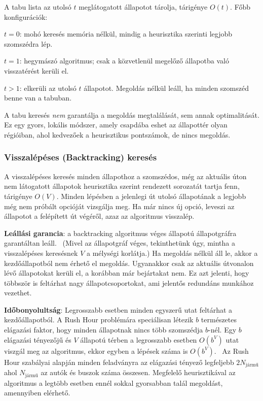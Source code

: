 A tabu lista az utolsó $t$ meglátogatott állapotot tárolja, tárigénye $O(t)$. Főbb konfigurációk:
\begin{compactitem}
\item $t = 0$: mohó keresés memória nélkül, mindig a heurisztika szerinti legjobb szomszédra lép.
\item $t = 1$: hegymászó algoritmus; csak a közvetlenül megelőző állapotba való visszatérést kerüli el.
\item $t > 1$: elkerüli az utolsó $t$ állapotot. Megoldás nélkül leáll, ha minden szomszéd benne van a tabuban.
\end{compactitem}

A tabu keresés \emph{nem} garantálja a megoldás megtalálását, sem annak optimalitását. Ez egy gyors, lokális módszer, amely csapdába eshet az állapottér olyan régióiban, ahol kedvezőek a heurisztikus pontszámok, de nincs megoldás.

\subsubsection{Visszalépéses (Backtracking) keresés}
\label{sec:backtracking}

A visszalépéses keresés minden állapothoz a szomszédos, még az aktuális úton nem látogatott állapotok heurisztika szerint rendezett sorozatát tartja fenn, tárigénye $O(V)$. Minden lépésben a jelenlegi út utolsó állapotának a legjobb még nem próbált opcióját vizsgálja meg. Ha már nincs új opció, leveszi az állapotot a felépített út végéről, azaz az algoritmus visszalép.


\textbf{Leállási garancia}: a backtracking algoritmus véges állapotú állapotgráfra garantáltan leáll.~\cite[46.~oldal, 3. bekezdés]{gregorics_2006_bevezetes} \cite[19.~oldal]{gregorics_backtrack} (Mivel az állapotgráf véges, tekinthetünk úgy, mintha a visszalépéses keresésnek  $V$ a mélységi korlátja.) Ha megoldás nélkül áll le, akkor a kezdőállapotból nem érhető el megoldás. Ugyanakkor csak az aktuális útvonalon lévő állapotokat kerüli el, a korábban már bejártakat nem. Ez azt jelenti, hogy többször is feltárhat nagy állapotcsoportokat, ami jelentős redundáns munkához vezethet.

\textbf{Időbonyolultság}: Legrosszabb esetben minden egyszerű utat feltárhat a kezdőállapotból. A Rush Hour problémára speciálisan létezik $b$ természetes elágazási faktor, hogy minden állapotnak nincs több szomszédja $b$-nél. Egy $b$ elágazási tényezőjű és $V$ állapotú térben a legrosszabb esetben $O(b^V)$ utat viszgál meg az algoritmus, ekkor egyben a lépések száma is $O(b^V)$.~\cite[Section~3.4]{russellnorvig2020} Az Rush Hour szabályai alapján minden feladványra az elágazási tényező legfeljebb $2 N_{\text{jármű}}$ ahol $N_{\text{jármű}}$ az autók és buszok száma összesen. Megfelelő heurisztikával az algoritmus a legtöbb esetben ennél sokkal gyorsabban talál megoldást, amennyiben elérhető.

